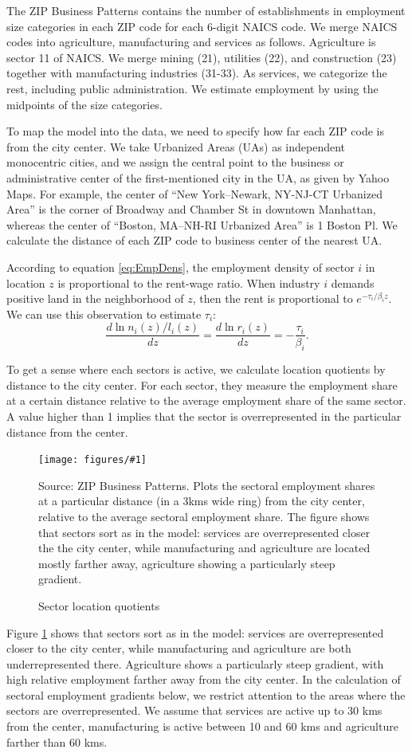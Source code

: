\documentclass[12pt]{article}
\newcommand{\dofigure}[3]{\begin{figure}
\begin{centering}
\texttt{[image: figures/\#1]}
  \caption{#2\label{fig:#1}}
\end{centering}

\noindent \footnotesize{#3}
\end{figure}}
\begin{document}
The ZIP Business Patterns contains the number of establishments in employment size categories in each ZIP code for each 6-digit NAICS code. We merge NAICS codes into agriculture, manufacturing and services as follows. Agriculture is sector 11 of NAICS. We merge mining (21), utilities (22), and construction (23) together with manufacturing industries (31-33). As services, we categorize the rest, including public administration. We estimate employment by using the midpoints of the size categories.

To map the model into the data, we need to specify how far each ZIP code is from the city center. We take Urbanized Areas (UAs) as independent monocentric cities, and we assign the central point to the business or administrative center of the first-mentioned city in the UA, as given by Yahoo Maps. For example, the center of ``New York–Newark, NY-NJ-CT Urbanized Area'' is the corner of Broadway and Chamber St in downtown Manhattan, whereas the center of ``Boston, MA–NH-RI Urbanized Area'' is 1 Boston Pl. We calculate the distance of each ZIP code to business center of the nearest UA.

According to equation \ref{eq:EmpDens}, the employment density of sector $i$ in location $z$ is proportional to the rent-wage ratio. When industry $i$ demands positive land in the neighborhood of $z$, then the rent is proportional to $e^{-\tau_i/\beta_i z}$. We can use this observation to estimate $\tau_i$:
\[
\frac{d\ln n_i(z)/l_i(z)}{dz} =\frac{d\ln r_i(z)}{dz} = -\frac{\tau_i}{\beta_i}.
\]

To get a sense where each sectors is active, we calculate location quotients by distance to the city center. For each sector, they measure the employment share at a certain distance relative to the average employment share of the same sector. A value higher than 1 implies that the sector is overrepresented in the particular distance from the center.

\dofigure{sector_location_quotients}{Sector location quotients}{Source: ZIP Business Patterns. Plots the sectoral employment shares at a particular distance (in a 3kms wide ring) from the city center, relative to the average sectoral employment share. The figure shows that sectors sort as in the model: services are overrepresented closer the the city center, while manufacturing and agriculture are located mostly farther away, agriculture showing a particularly steep gradient.}

Figure \ref{fig:sector_location_quotients} shows that sectors sort as in the model: services are overrepresented closer to the city center, while manufacturing and agriculture are both underrepresented there. Agriculture shows a particularly steep gradient, with high relative employment farther away from the city center. In the calculation of sectoral employment gradients below, we restrict attention to the areas where the sectors are overrepresented. We assume that services are active up to 30 kms from the center, manufacturing is active between 10 and 60 kms and agriculture farther than 60 kms.
\end{document}
